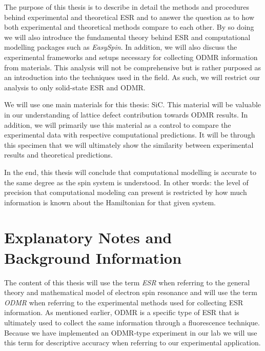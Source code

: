 \documentclass[oneside, noacknowlegments]{BYUPhys}
\begin{document}
The purpose of this thesis is to describe in detail the methods and procedures behind experimental and theoretical ESR and to answer the question as to how both experimental and theoretical methods compare to each other. By so doing we will also introduce the fundamental theory behind ESR and computational modelling packages such as \textit{EasySpin}. In addition, we will also discuss the experimental frameworks and setups necessary for collecting ODMR information from materials. This analysis will not be comprehensive but is rather purposed as an introduction into the techniques used in the field. As such, we will restrict our analysis to only solid-state ESR and ODMR.

We will use one main materials for this thesis: SiC. This material will be valuable in our understanding of lattice defect contribution towards ODMR results. In addition, we will primarily use this material as a control to compare the experimental data with respective computational predictions. It will be through this specimen that we will ultimately show the similarity between experimental results and theoretical predictions.

In the end, this thesis will conclude that computational modelling is accurate to the same degree as the spin system is understood. In other words: the level of precision that computational modeling can present is restricted by how much information is known about the Hamiltonian for that given system.

\section{Explanatory Notes and Background Information}

The content of this thesis will use the term \textit{ESR} when referring to the general theory and mathematical model of electron spin resonance and will use the term \textit{ODMR} when referring to the experimental methods used for collecting ESR information. As mentioned earlier, ODMR is a specific type of ESR that is ultimately used to collect the same information through a fluorescence technique. Because we have implemented an ODMR-type experiment in our lab we will use this term for descriptive accuracy when referring to our experimental application.
\end{document}
